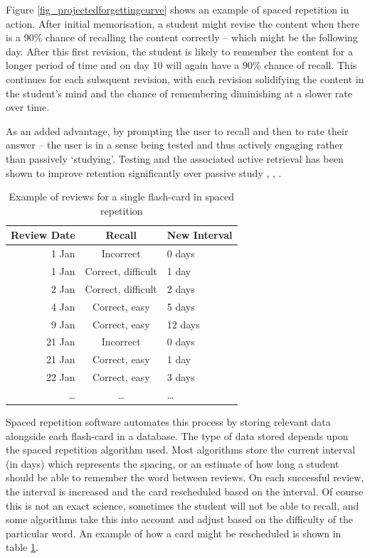 Figure \ref{fig_projectedforgettingcurve} shows an example of spaced repetition in
action. After initial memorisation, a student might revise the content when there
is a 90\% chance of recalling the content correctly -- which might be the following day.
After this first revision, the student is likely to remember the content for a longer
period of time and on day 10 will again have a 90\% chance of recall. This continues
for each subsquent revision, with each revision solidifying the content in the student's
mind and the chance of remembering diminishing at a slower rate over time.

As an added advantage, by prompting the user to recall and then to rate their answer -- the user
is in a sense being tested and thus actively engaging rather than passively `studying'.
Testing and the associated active retrieval has been shown to improve retention
significantly over passive study \cite{effects_of_recall_tests_1969},
\cite{retrieval_for_learning_2008}, \cite{power_of_testing_memory_2006}.

\begin{table}[h!]
\caption{Example of reviews for a single flash-card in spaced repetition}
\label{tbl_spacedrepetitionexample}
\begin{tabular}{|r|c|l|}
\hline
Review Date & Recall & New Interval \\
\hline
1 Jan & Incorrect & 0 days \\
1 Jan & Correct, difficult & 1 day \\
2 Jan & Correct, difficult & 2 days \\
4 Jan & Correct, easy & 5 days \\
9 Jan & Correct, easy & 12 days \\
21 Jan & Incorrect & 0 days \\
21 Jan & Correct, easy & 1 day \\
22 Jan & Correct, easy & 3 days \\
\ldots & \ldots & \ldots \\
\hline
\end{tabular}
\end{table}

Spaced repetition software automates this process by storing relevant data alongside each
flash-card in a database. The type of data stored depends upon the spaced repetition algorithm
used. Most algorithms store the current interval (in days) which represents the spacing, or
an estimate of how long a student should be able to remember the word between reviews.
On each successful review, the interval is increased and the card rescheduled based on
the interval. Of course this is not an exact science, sometimes the student will not be able to recall,
and some algorithms take this into account and adjust based on the difficulty of the
particular word. An example of how a card might be rescheduled
is shown in table \ref{tbl_spacedrepetitionexample}.

